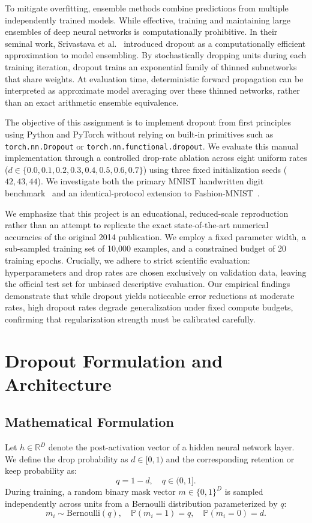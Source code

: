 \documentclass[conference]{IEEEtran}
\begin{document}
To mitigate overfitting, ensemble methods combine predictions from multiple independently trained models. While effective, training and maintaining large ensembles of deep neural networks is computationally prohibitive. In their seminal work, Srivastava et al.~\cite{srivastava2014dropout} introduced dropout as a computationally efficient approximation to model ensembling. By stochastically dropping units during each training iteration, dropout trains an exponential family of thinned subnetworks that share weights. At evaluation time, deterministic forward propagation can be interpreted as approximate model averaging over these thinned networks, rather than an exact arithmetic ensemble equivalence.

The objective of this assignment is to implement dropout from first principles using Python and PyTorch without relying on built-in primitives such as \texttt{torch.nn.Dropout} or \texttt{torch.nn.functional.dropout}. We evaluate this manual implementation through a controlled drop-rate ablation across eight uniform rates ($d \in \{0.0, 0.1, 0.2, 0.3, 0.4, 0.5, 0.6, 0.7\}$) using three fixed initialization seeds ($42, 43, 44$). We investigate both the primary MNIST handwritten digit benchmark~\cite{lecun1998mnist} and an identical-protocol extension to Fashion-MNIST~\cite{xiao2017fashion}.

We emphasize that this project is an educational, reduced-scale reproduction rather than an attempt to replicate the exact state-of-the-art numerical accuracies of the original 2014 publication. We employ a fixed parameter width, a sub-sampled training set of 10,000 examples, and a constrained budget of 20 training epochs. Crucially, we adhere to strict scientific evaluation: hyperparameters and drop rates are chosen exclusively on validation data, leaving the official test set for unbiased descriptive evaluation. Our empirical findings demonstrate that while dropout yields noticeable error reductions at moderate rates, high dropout rates degrade generalization under fixed compute budgets, confirming that regularization strength must be calibrated carefully.

\section{Dropout Formulation and Architecture}

\subsection{Mathematical Formulation}
Let $h \in \mathbb{R}^D$ denote the post-activation vector of a hidden neural network layer. We define the drop probability as $d \in [0, 1)$ and the corresponding retention or keep probability as:
\begin{equation}
q = 1 - d, \quad q \in (0, 1].
\end{equation}
During training, a random binary mask vector $m \in \{0, 1\}^D$ is sampled independently across units from a Bernoulli distribution parameterized by $q$:
\begin{equation}
m_i \sim \text{Bernoulli}(q), \quad \mathbb{P}(m_i = 1) = q, \quad \mathbb{P}(m_i = 0) = d.
\end{equation}
\end{document}
